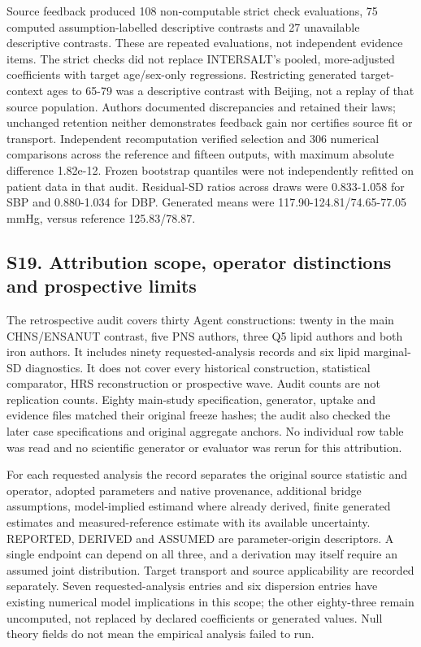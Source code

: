 \documentclass[11pt,letterpaper]{article}
\begin{document}
\endgroup

Source feedback produced 108 non-computable strict check evaluations, 75 computed assumption-labelled descriptive contrasts and 27 unavailable descriptive contrasts. These are repeated evaluations, not independent evidence items. The strict checks did not replace INTERSALT's pooled, more-adjusted coefficients with target age/\allowbreak{}sex-only regressions. Restricting generated target-context ages to 65-79 was a descriptive contrast with Beijing, not a replay of that source population. Authors documented discrepancies and retained their laws; unchanged retention neither demonstrates feedback gain nor certifies source fit or transport. Independent recomputation verified selection and 306 numerical comparisons across the reference and fifteen outputs, with maximum absolute difference 1.82e-12. Frozen bootstrap quantiles were not independently refitted on patient data in that audit. Residual-SD ratios across draws were 0.833-1.058 for SBP and 0.880-1.034 for DBP. Generated means were 117.90-124.81/\allowbreak{}74.65-77.05 mmHg, versus reference 125.83/\allowbreak{}78.87.


\subsection*{S19. Attribution scope, operator distinctions and prospective limits}

The retrospective audit covers thirty Agent constructions: twenty in the main CHNS/\allowbreak{}ENSANUT contrast, five PNS authors, three Q5 lipid authors and both iron authors. It includes ninety requested-analysis records and six lipid marginal-SD diagnostics. It does not cover every historical construction, statistical comparator, HRS reconstruction or prospective wave. Audit counts are not replication counts. Eighty main-study specification, generator, uptake and evidence files matched their original freeze hashes; the audit also checked the later case specifications and original aggregate anchors. No individual row table was read and no scientific generator or evaluator was rerun for this attribution.


For each requested analysis the record separates the original source statistic and operator, adopted parameters and native provenance, additional bridge assumptions, model-implied estimand where already derived, finite generated estimates and measured-reference estimate with its available uncertainty. REPORTED, DERIVED and ASSUMED are parameter-origin descriptors. A single endpoint can depend on all three, and a derivation may itself require an assumed joint distribution. Target transport and source applicability are recorded separately. Seven requested-analysis entries and six dispersion entries have existing numerical model implications in this scope; the other eighty-three remain uncomputed, not replaced by declared coefficients or generated values. Null theory fields do not mean the empirical analysis failed to run.
\end{document}
